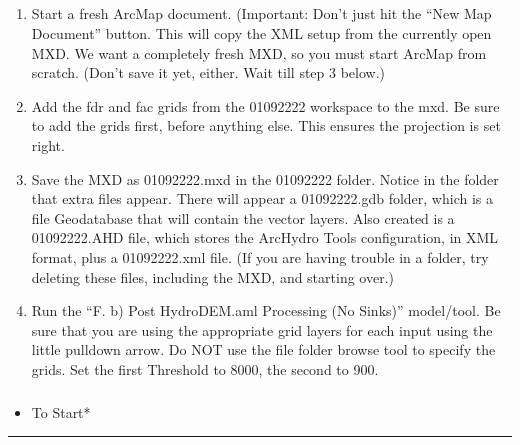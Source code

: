 \documentclass[letterpaper,10pt,english]{sphinxmanual}
\begin{document}
\subparagraph{}
\label{\detokenize{ex_2:old-directions-that-no-longer-work}}\begin{enumerate}
\def\theenumi{\arabic{enumi}}
\def\labelenumi{\theenumi .}
\makeatletter\def\p@enumii{\p@enumi \theenumi .}\makeatother
\item {} 
Start a fresh ArcMap document. (Important: Don’t just hit the “New Map Document” button. This will copy the XML setup from the currently open MXD. We want a completely fresh MXD, so you must start ArcMap from scratch. (Don’t save it yet, either. Wait till step 3 below.)

\item {} 
Add the fdr and fac grids from the 01092222 workspace to the mxd.  Be sure to add the grids first, before anything else. This ensures the projection is set right.

\item {} 
Save the MXD as 01092222.mxd in the 01092222 folder. Notice in the folder that extra files appear. There will appear a 01092222.gdb folder, which is a file Geodatabase that will contain the vector layers. Also created is a 01092222.AHD file, which stores the ArcHydro Tools configuration, in XML format, plus a 01092222.xml file. (If you are having trouble in a folder, try deleting these files, including the MXD, and starting over.)

\item {} 
Run the “F. b) Post HydroDEM.aml Processing (No Sinks)” model/tool. Be sure that you are using the appropriate grid layers for each input using the little pulldown arrow. Do NOT use the file folder browse tool to specify the grids. Set the first Threshold to 8000, the second to 900.

\end{enumerate}


\subparagraph{}
\label{\detokenize{ex_2:post-hydrodem-with-sinks}}\begin{itemize}
\item {} 
To Start*

\end{itemize}


\bigskip\hrule\bigskip
\end{document}
